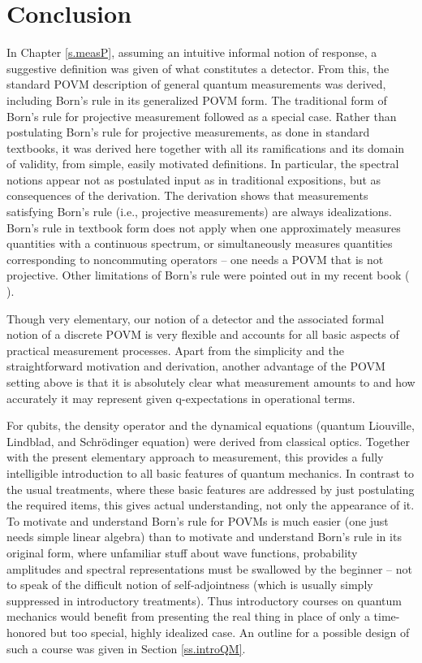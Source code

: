 \documentclass[12pt]{article}
\begin{document}
\section{Conclusion}

In Chapter \ref{s.measP}, assuming an intuitive informal notion of 
response, a suggestive definition was given of what constitutes a 
detector. From this, the standard POVM description of general quantum 
measurements was derived,
including Born's rule in its generalized POVM form. The traditional form
of Born's rule for projective measurement followed as a special case.
Rather than postulating Born's rule for projective measurements, as done
in standard textbooks, it was derived here together with all its
ramifications and its domain of validity, from simple, easily motivated
definitions. In particular, the spectral notions appear not as
postulated input as in traditional expositions, but as consequences of
the derivation. The derivation shows that measurements satisfying Born's
rule (i.e., projective measurements) are always idealizations. Born's 
rule in textbook form does not apply when one approximately measures 
quantities with a continuous spectrum, or simultaneously measures 
quantities corresponding to noncommuting operators -- one needs a POVM 
that is not projective. Other limitations of Born's rule were pointed 
out in my recent book ( \cite[Section 14.3]{Neu.CQP}).

Though very elementary, our notion of a detector and the associated
formal notion of a discrete POVM  is very flexible and accounts for all
basic aspects of practical measurement processes.
Apart from the simplicity and the straightforward motivation and
derivation, another advantage of the POVM setting above is that it is
absolutely clear what measurement amounts to and how accurately it may
represent given q-expectations in operational terms.

For qubits, the density operator and the dynamical equations (quantum 
Liouville, Lindblad, and Schr\"odinger equation) were derived
from classical optics. Together with the present elementary approach
to measurement, this provides a fully intelligible introduction to all
basic features of quantum mechanics.
In contrast to the usual treatments, where these basic features are
addressed by just postulating the required items, this gives actual
understanding, not only the appearance of it.
To motivate and understand Born's rule for POVMs is much easier (one
just needs simple linear algebra) than to motivate and understand
Born's rule in its original form, where unfamiliar stuff about wave
functions, probability amplitudes and spectral representations must be
swallowed by the beginner -- not to speak of the difficult notion of 
self-adjointness (which is usually simply suppressed in introductory 
treatments). Thus introductory courses on quantum mechanics would 
benefit from presenting the real thing in place of only a time-honored 
but too special, highly idealized case. An outline for a possible 
design of such a course was given in Section \ref{ss.introQM}.
\end{document}
